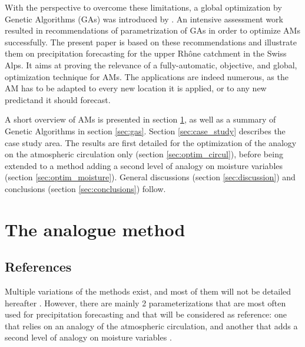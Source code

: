 \documentclass[5p]{elsarticle}
\begin{document}
With the perspective to overcome these limitations, a global optimization by Genetic Algorithms (GAs) was introduced by \citet{Horton2016a}. An intensive assessment work resulted in recommendations of parametrization of GAs in order to optimize AMs successfully. The present paper is based on these recommendations and illustrate them on precipitation forecasting for the upper Rh\^{o}ne catchment in the Swiss Alps. It aims at proving the relevance of a fully-automatic, objective, and global, optimization technique for AMs. The applications are indeed numerous, as the AM has to be adapted to every new location it is applied, or to any new predictand it should forecast.

A short overview of AMs is presented in section \ref{sec:analog_method}, as well as a summary of Genetic Algorithms in section \ref{sec:gas}. Section \ref{sec:case_study} describes the case study area. The results are first detailed for the optimization of the analogy on the atmospheric circulation only (section \ref{sec:optim_circul}), before being extended to a method adding a second level of analogy on moisture variables (section \ref{sec:optim_moisture}). General discussions (section \ref{sec:discussion}) and conclusions (section \ref{sec:conclusions}) follow.


\section{The analogue method}
\label{sec:analog_method}

\subsection{References}
\label{sec:references}

Multiple variations of the methods exist, and most of them will not be detailed hereafter \cite[see][for more comprehensive listings]{Horton2016, BenDaoud2015}. However, there are mainly 2 parameterizations that are most often used for precipitation forecasting and that will be considered as reference: one that relies on an analogy of the atmospheric circulation, and another that adds a second level of analogy on moisture variables \citep{Obled2002, Bontron2005, Marty2012}.
\end{document}
